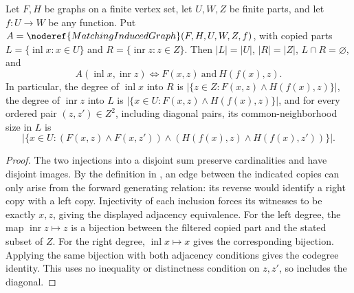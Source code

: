 \begin{lemma}
Let $F,H$ be graphs on a finite vertex set, let $U,W,Z$ be finite parts,
and let $f:U\to W$ be any function. Put
$A=\noderef{MatchingInducedGraph}(F,H,U,W,Z,f)$, with copied parts
$L=\{\operatorname{inl}x:x\in U\}$ and
$R=\{\operatorname{inr}z:z\in Z\}$. Then $|L|=|U|$, $|R|=|Z|$,
$L\cap R=\varnothing$, and
\[
 A(\operatorname{inl}x,\operatorname{inr}z)
 \iff F(x,z)\ \text{and}\ H(f(x),z).
\]
In particular, the degree of $\operatorname{inl}x$ into $R$ is
$|\{z\in Z:F(x,z)\land H(f(x),z)\}|$, the degree of
$\operatorname{inr}z$ into $L$ is
$|\{x\in U:F(x,z)\land H(f(x),z)\}|$, and for every ordered pair
$(z,z')\in Z^2$, including diagonal pairs, its common-neighborhood size
in $L$ is
\[
 |\{x\in U:(F(x,z)\land F(x,z'))\land
                    (H(f(x),z)\land H(f(x),z'))\}|.
\]
\end{lemma}
\begin{proof}
The two injections into a disjoint sum preserve cardinalities and have
disjoint images. By the definition in ,
an edge between the indicated copies can only arise from the forward
generating relation: its reverse would identify a right copy with a left
copy. Injectivity of each inclusion forces its witnesses to be exactly
$x,z$, giving the displayed adjacency equivalence. For the left degree,
the map $\operatorname{inr}z\mapsto z$ is a bijection between the filtered
copied part and the stated subset of $Z$. For the right degree,
$\operatorname{inl}x\mapsto x$ gives the corresponding bijection.
Applying the same bijection with both adjacency conditions gives the
codegree identity. This uses no inequality or distinctness condition on
$z,z'$, so includes the diagonal.
\end{proof}
